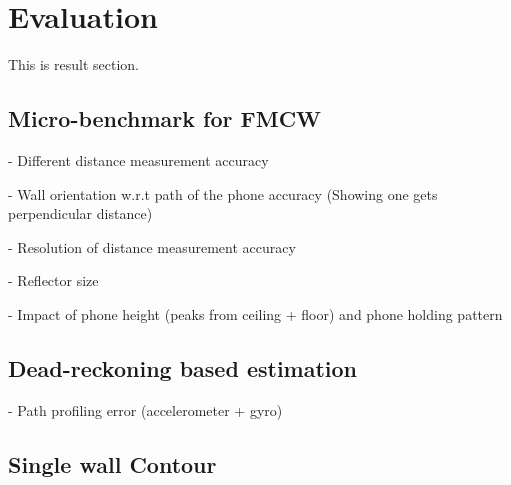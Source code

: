 \section{Evaluation}\label{sec:results}
This is result section.

\subsection{Micro-benchmark for FMCW}

    - Different distance measurement accuracy

    - Wall orientation w.r.t path of the phone accuracy (Showing one gets perpendicular distance)
 
    - Resolution of distance measurement accuracy

    - Reflector size

   - Impact of phone height (peaks from ceiling + floor) and phone holding pattern
   
\subsection{Dead-reckoning based estimation}
   - Path profiling error (accelerometer + gyro)
   \begin{figure}[h!t]
   \end{figure}
   
\subsection{Single wall Contour}

